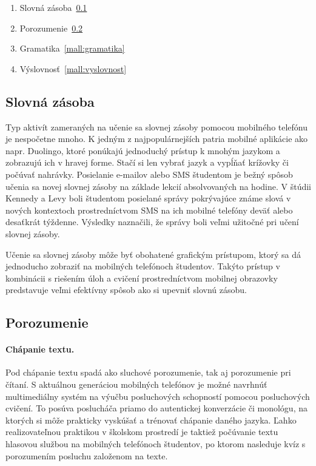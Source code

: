 \documentclass[10pt,oneside,slovak,a4paper]{article}
\begin{document}
\begin{enumerate}
\item Slovná zásoba~\ref{mall:slovnazasoba}
\item Porozumenie~\ref{mall:porozumenie}
\item Gramatika~\ref{mall:gramatika}
\item Výslovnosť~\ref{mall:vyslovnost}
\end{enumerate}


\subsection{Slovná zásoba} \label{mall:slovnazasoba}

Typ aktivít zameraných na učenie sa slovnej zásoby pomocou mobilného telefónu je nespočetne mnoho. K jedným z najpopulárnejších patria mobilné aplikácie ako napr. Duolingo, ktoré ponúkajú jednoduchý prístup k mnohým jazykom a zobrazujú ich v hravej forme. Stačí si len vybrať jazyk a vypĺňať krížovky či počúvať nahrávky. Posielanie e-mailov alebo SMS študentom je bežný spôsob učenia sa novej slovnej zásoby na základe lekcií absolvovaných na hodine. V štúdii Kennedy a Levy boli študentom posielané správy pokrývajúce známe slová v nových kontextoch prostredníctvom SMS na ich mobilné telefóny deväť alebo desaťkrát týždenne. Výsledky naznačili, že správy boli veľmi užitočné pri učení slovnej zásoby\cite{Kennedy2008}. 

Učenie sa slovnej zásoby môže byť obohatené grafickým prístupom, ktorý sa dá jednoducho zobraziť na mobilných telefónoch študentov. Takýto prístup v kombinácii s riešením úloh a cvičení prostredníctvom mobilnej obrazovky predstavuje veľmi efektívny spôsob ako si upevniť slovnú zásobu.

\subsection{Porozumenie} \label{mall:porozumenie}

\paragraph{Chápanie textu.}
Pod chápanie textu spadá ako sluchové porozumenie, tak aj porozumenie pri čítaní. S aktuálnou generáciou mobilných telefónov je možné navrhnúť multimediálny systém na výučbu posluchových schopností pomocou posluchových cvičení\cite{Miangah2012}. To posúva poslucháča priamo do autentickej konverzácie či monológu, na ktorých si môže prakticky vyskúšať a trénovať chápanie daného jazyka. Ľahko realizovateľnou praktikou v školskom prostredí je taktiež počúvanie textu hlasovou službou na mobilných telefónoch študentov, po ktorom nasleduje kvíz s porozumením posluchu založenom na texte.
\end{document}
